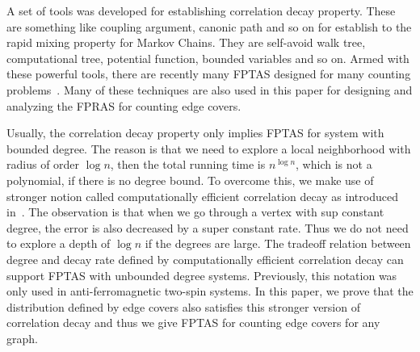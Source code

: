 A set of tools was developed for establishing correlation decay property. These are something like coupling argument, canonic path and so on for establish to the rapid mixing property for Markov Chains.
They are self-avoid walk tree, computational tree, potential function, bounded variables and so on. Armed with these powerful tools, there are recently many FPTAS designed for many counting problems~\cite{}. 
Many of these techniques are also used in this paper for designing and analyzing the FPRAS for counting edge covers.  

Usually, the correlation decay property only implies FPTAS for system with bounded degree. The reason is that
we need to explore a local neighborhood with radius of order $\log n$, then the total running time is $n^{\log n}$, which is not a polynomial, if there is no degree bound. To overcome this, we make use of stronger notion called computationally efficient correlation decay
as introduced in~\cite{LLY12}. The observation is that when we go through a vertex with sup constant degree, the error is also decreased by a super constant rate. Thus we do not need to explore a depth of $\log n$ if the degrees are large. The tradeoff relation between degree and decay rate defined by  computationally efficient correlation decay can support FPTAS with unbounded degree systems. Previously, this notation was only used in anti-ferromagnetic two-spin systems. In this paper, we prove that the distribution defined by edge covers also satisfies this stronger version of correlation decay and thus we give FPTAS for counting edge covers for any graph.  
